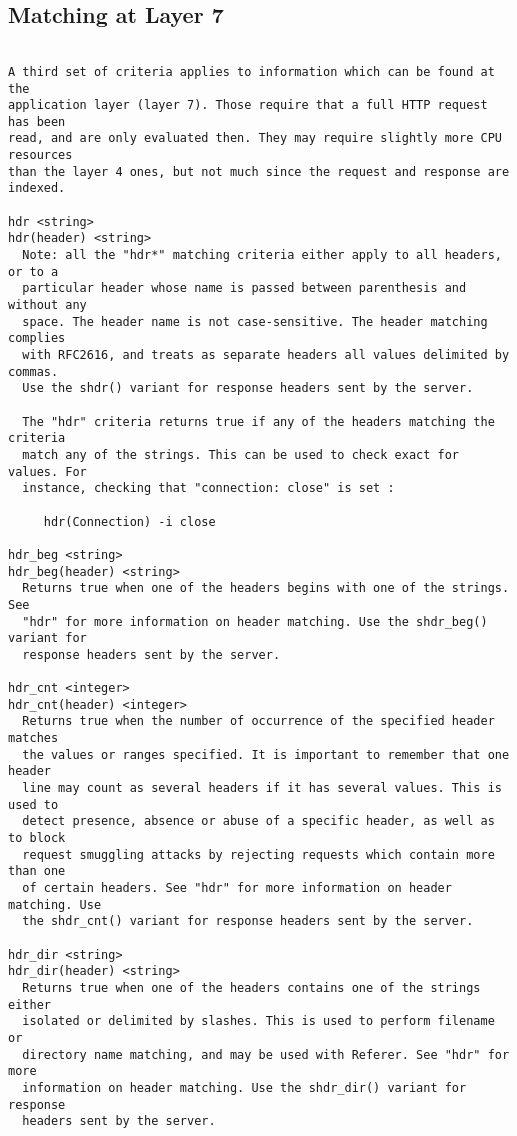 
\subsection{Matching at Layer 7}

\begin{verbatim}

A third set of criteria applies to information which can be found at the
application layer (layer 7). Those require that a full HTTP request has been
read, and are only evaluated then. They may require slightly more CPU resources
than the layer 4 ones, but not much since the request and response are indexed.

hdr <string>
hdr(header) <string>
  Note: all the "hdr*" matching criteria either apply to all headers, or to a
  particular header whose name is passed between parenthesis and without any
  space. The header name is not case-sensitive. The header matching complies
  with RFC2616, and treats as separate headers all values delimited by commas.
  Use the shdr() variant for response headers sent by the server.

  The "hdr" criteria returns true if any of the headers matching the criteria
  match any of the strings. This can be used to check exact for values. For
  instance, checking that "connection: close" is set :

     hdr(Connection) -i close

hdr_beg <string>
hdr_beg(header) <string>
  Returns true when one of the headers begins with one of the strings. See
  "hdr" for more information on header matching. Use the shdr_beg() variant for
  response headers sent by the server.

hdr_cnt <integer>
hdr_cnt(header) <integer>
  Returns true when the number of occurrence of the specified header matches
  the values or ranges specified. It is important to remember that one header
  line may count as several headers if it has several values. This is used to
  detect presence, absence or abuse of a specific header, as well as to block
  request smuggling attacks by rejecting requests which contain more than one
  of certain headers. See "hdr" for more information on header matching. Use
  the shdr_cnt() variant for response headers sent by the server.

hdr_dir <string>
hdr_dir(header) <string>
  Returns true when one of the headers contains one of the strings either
  isolated or delimited by slashes. This is used to perform filename or
  directory name matching, and may be used with Referer. See "hdr" for more
  information on header matching. Use the shdr_dir() variant for response
  headers sent by the server.


\end{verbatim}

